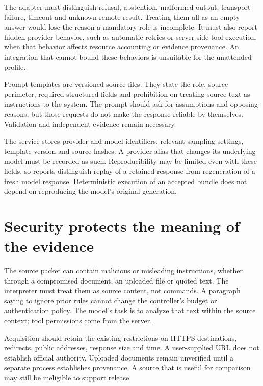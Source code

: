 The adapter must distinguish refusal, abstention, malformed output, transport
failure, timeout and unknown remote result. Treating them all as an empty answer
would lose the reason a mandatory role is incomplete. It must also report hidden
provider behavior, such as automatic retries or server-side tool execution, when
that behavior affects resource accounting or evidence provenance. An integration
that cannot bound these behaviors is unsuitable for the unattended profile.

Prompt templates are versioned source files. They state the role, source
perimeter, required structured fields and prohibition on treating source text as
instructions to the system. The prompt should ask for assumptions and opposing
reasons, but those requests do not make the response reliable by themselves.
Validation and independent evidence remain necessary.

The service stores provider and model identifiers, relevant sampling settings,
template version and source hashes. A provider alias that changes its underlying
model must be recorded as such. Reproducibility may be limited even with these
fields, so reports distinguish replay of a retained response from regeneration of
a fresh model response. Deterministic execution of an accepted bundle does not
depend on reproducing the model's original generation.

\section{Security protects the meaning of the evidence}
\label{merge:M08:10}


The source packet can contain malicious or misleading instructions, whether
through a compromised document, an uploaded file or quoted text. The interpreter
must treat them as source content, not commands. A paragraph saying to ignore
prior rules cannot change the controller's budget or authentication policy. The
model's task is to analyze that text within the source context; tool permissions
come from the server.

Acquisition should retain the existing restrictions on HTTPS destinations,
redirects, public addresses, response size and time. A user-supplied URL does not
establish official authority. Uploaded documents remain unverified until a
separate process establishes provenance. A source that is useful for comparison
may still be ineligible to support release.

